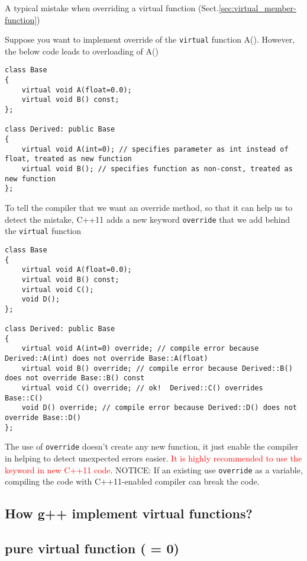 A typical mistake when overriding a virtual function (Sect.\ref{sec:virtual_member-function})

Suppose you want to implement override of the \verb!virtual! function A().
However, the below code leads to overloading of A()
\begin{Verbatim}
class Base
{
    virtual void A(float=0.0);
    virtual void B() const;
};
 
class Derived: public Base
{
    virtual void A(int=0); // specifies parameter as int instead of float, treated as new function
    virtual void B(); // specifies function as non-const, treated as new function
};
\end{Verbatim}

To tell the compiler that we want an override method, so that it can help us to
detect the mistake, C++11 adds a new keyword \verb!override! that we add behind
the \verb!virtual! function
\begin{Verbatim}
class Base
{
    virtual void A(float=0.0);
    virtual void B() const;
    virtual void C();
    void D();
};
 
class Derived: public Base
{
    virtual void A(int=0) override; // compile error because Derived::A(int) does not override Base::A(float)
    virtual void B() override; // compile error because Derived::B() does not override Base::B() const
    virtual void C() override; // ok!  Derived::C() overrides Base::C()
    void D() override; // compile error because Derived::D() does not override Base::D()
};
\end{Verbatim}
The use of \verb!override! doesn't create any new function, it just enable
the compiler in helping to detect unexpected errors easier. \textcolor{red}{It
is highly recommended to use the keyword in new C++11 code}. NOTICE: If an
existing use \verb!override! as a variable, compiling the code with
C++11-enabled compiler can break the code.

\subsection{How g++ implement virtual functions?}
\label{sec:virtual-function_GCC}









\subsection{pure virtual function ( = 0)}
\label{sec:OO_pure-virtual-function}

